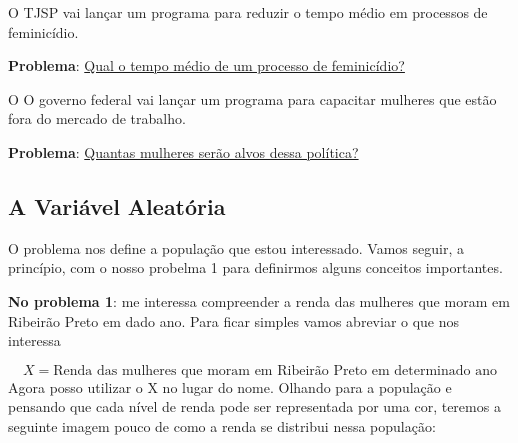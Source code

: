 \documentclass[
  letterpaper,
  DIV=11,
  numbers=noendperiod]{scrreprt}
\begin{document}
\begin{tcolorbox}[enhanced jigsaw, titlerule=0mm, colback=white, coltitle=black, opacityback=0, breakable, colbacktitle=quarto-callout-note-color!10!white, toprule=.15mm, colframe=quarto-callout-note-color-frame, toptitle=1mm, bottomtitle=1mm, opacitybacktitle=0.6, left=2mm, arc=.35mm, rightrule=.15mm, bottomrule=.15mm, leftrule=.75mm, title=\textcolor{quarto-callout-note-color}{\faInfo}\hspace{0.5em}{Problema 2}]

O TJSP vai lançar um programa para reduzir o tempo médio em processos de
feminicídio.

\textbf{Problema}: \ul{Qual o tempo médio de um processo de
feminicídio?}

\end{tcolorbox}

\begin{tcolorbox}[enhanced jigsaw, titlerule=0mm, colback=white, coltitle=black, opacityback=0, breakable, colbacktitle=quarto-callout-note-color!10!white, toprule=.15mm, colframe=quarto-callout-note-color-frame, toptitle=1mm, bottomtitle=1mm, opacitybacktitle=0.6, left=2mm, arc=.35mm, rightrule=.15mm, bottomrule=.15mm, leftrule=.75mm, title=\textcolor{quarto-callout-note-color}{\faInfo}\hspace{0.5em}{Problema 3}]

O O governo federal vai lançar um programa para capacitar mulheres que
estão fora do mercado de trabalho.

\textbf{Problema}: \ul{Quantas mulheres serão alvos dessa política?}

\end{tcolorbox}

\subsection{A Variável Aleatória}\label{a-variuxe1vel-aleatuxf3ria}

O problema nos define a população que estou interessado. Vamos seguir, a
princípio, com o nosso probelma 1 para definirmos alguns conceitos
importantes.

\textbf{No problema 1}: me interessa compreender a renda das mulheres
que moram em Ribeirão Preto em dado ano. Para ficar simples vamos
abreviar o que nos interessa

\[X=\text{Renda das mulheres que moram em Ribeirão Preto em determinado ano}\]
Agora posso utilizar o X no lugar do nome. Olhando para a população e
pensando que cada nível de renda pode ser representada por uma cor,
teremos a seguinte imagem pouco de como a renda se distribui nessa
população:
\end{document}
